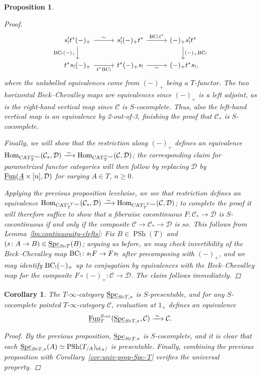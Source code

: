 \documentclass[reqno]{memo-l}
\theoremstyle{mythm}
\newtheorem{cor}[thm]{Corollary}
\newtheorem{prop}[thm]{Proposition}
\theoremstyle{definition}
\numberwithin{equation}{section}
\newcommand{\Cc}{{\mathcal{C}}}
\newcommand{\Dd}{{\mathcal{D}}}
\DeclareMathOperator{\Spc}{Spc}
\DeclareMathOperator{\CAT}{CAT}
\renewcommand{\hom}{\textup{hom}}
\newcommand{\Fun}{{\textup{Fun}}}
\DeclareMathOperator{\PSh}{PSh}
\renewcommand{\hom}{{\textup{Hom}}}
\DeclareMathOperator{\core}{\iota}
\newcommand{\id}{\textup{id}}
\newcommand{\BC}{\textup{BC}}
\newcommand{\ulhelper}[2]{\underline{\setbox0=\hbox{$#1#2$}\dp0=0.4pt \box0\relax}}
\newcommand{\ul}[1]{{\mathpalette\ulhelper{#1}}\hbox{\rule[-2pt]{0pt}{0pt}}}
\newcommand{\iso}{\xrightarrow{\;\smash{\raisebox{-0.25ex}{\ensuremath{\scriptstyle\sim}}}\;}}
\begin{document}
\begin{prop}
\begin{proof}
\[\begin{tikzcd}
                s'_!t^*(-)_+\arrow[r,"\sim"]\arrow[d,"\BC_!(-)_+"'] &[.5em] s'_!(-)_+t^*\arrow[r,"\BC_!t^*"] &[.5em] (-)_+s'_!t^*\arrow[d, "(-)_+\BC_!"]\\
                t^*s_!(-)_+\arrow[r,"t^*\BC_!"'] & t^*(-)_+s_!\arrow[r,"\sim"'] & (-)_+t^*s_!\rlap,
            \end{tikzcd}
        \]
        where the unlabelled equivalences come from $(-)_+$ being a $T$-functor. The two horizontal Beck--Chevalley maps are equivalences since $(-)_+$ is a left adjoint, as is the right-hand vertical map since $\Cc$ is $S$-cocomplete. Thus, also the left-hand vertical map is an equivalence by 2-out-of-3, finishing the proof that $\Cc_*$ is $S$-cocomplete.

        Finally, we will show that the restriction along $(-)_+$ defines an equivalence $\hom_{\CAT_T^\text{$S$-cc}}(\Cc_*,\Dd)\iso\hom_{\CAT_T^\text{$S$-cc}}(\Cc,\Dd)$; the corresponding claim for param\-etrized functor categories will then follow by replacing $\Dd$ by $\ul\Fun(\ul A\times[n],\Dd)$ for varying $A\in T$, $n\ge0$.

        Applying the previous proposition levelwise, we see that restriction defines an equivalence $\hom_{\CAT_T^\text{$\core T$-cc}}(\Cc_*,\Dd)\iso\hom_{\CAT_T^\text{$\core T$-cc}}(\Cc,\Dd)$; to complete the proof it will therefore suffice to show that a fiberwise cocontinuous $F\colon\Cc_*\to\Dd$ is $S$-cocontinuous if and only if the composite $\Cc\to\Cc_*\to\Dd$ is so. 
        This follows from Lemma~\ref{lm:continuouity-clefts}: Fix $B\in\PSh(T)$ and $(s\colon A\to B)\in\ul\Spc_{S\triangleright T}(B)$; arguing as before, we may check invertibility of the Beck--Chevalley map $\BC_!\colon s_!F\to Fs_!$ after precomposing with $(-)_+$, and we may identify $\BC_!(-)_+$ up to conjugation by equivalences with the Beck--Chevalley map for the composite $F\circ(-)_+\colon\Cc\to\Dd$. The claim follows immediately.
    \end{proof}
\end{prop}

\begin{cor}\label{cor:Spc-S-T-*-pres}
    The $T$-$\infty$-category $\ul\Spc_{S\triangleright T,*}$ is $S$-presentable, and for any $S$-cocomplete pointed $T$-$\infty$-category $\Cc$, evaluation at $1_+$ defines an equivalence
    \[
        \ul\Fun_T^\textup{$S$-cc}(\ul\Spc_{S\triangleright T,*},\Cc)\iso\Cc.
    \]
    \begin{proof}
        By the previous proposition, $\ul\Spc_{S\triangleright T,*}$ is $S$-cocomplete, and it is clear that each $\ul\Spc_{S\triangleright T,*}(A)\simeq\PSh(T_{/A})_{\id_A/}$ is presentable. Finally, combining the previous proposition with Corollary~\ref{cor:univ-prop-Spc-T} verifies the universal property.
    \end{proof}
\end{cor}
\end{document}
